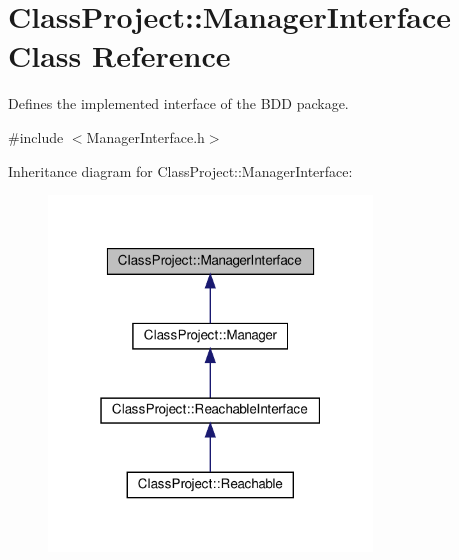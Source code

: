 \hypertarget{classClassProject_1_1ManagerInterface}{}\section{Class\+Project\+:\+:Manager\+Interface Class Reference}
\label{classClassProject_1_1ManagerInterface}


Defines the implemented interface of the B\+DD package.  




{\ttfamily \#include $<$Manager\+Interface.\+h$>$}



Inheritance diagram for Class\+Project\+:\+:Manager\+Interface\+:
\nopagebreak
\begin{figure}[H]
\begin{center}
\leavevmode
\includegraphics[width=244pt]{classClassProject_1_1ManagerInterface__inherit__graph}
\end{center}
\end{figure}
